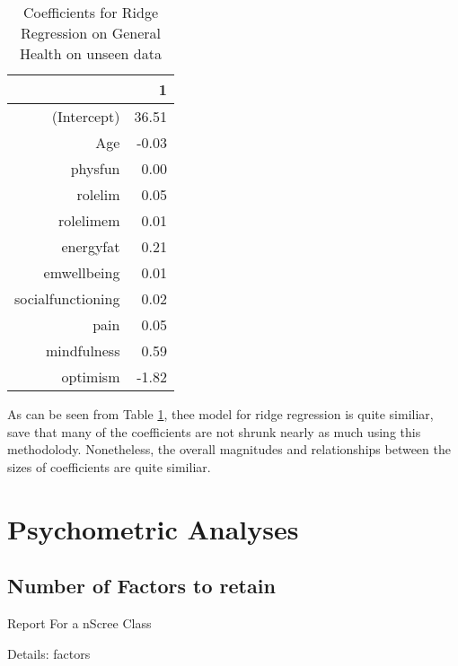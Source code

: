 \documentclass{article}
\begin{document}
\begin{table}[ht]
\centering
\begin{tabular}{rr}
  \hline
 & 1 \\ 
  \hline
(Intercept) & 36.51 \\ 
  Age & -0.03 \\ 
  physfun & 0.00 \\ 
  rolelim & 0.05 \\ 
  rolelimem & 0.01 \\ 
  energyfat & 0.21 \\ 
  emwellbeing & 0.01 \\ 
  socialfunctioning & 0.02 \\ 
  pain & 0.05 \\ 
  mindfulness & 0.59 \\ 
  optimism & -1.82 \\ 
   \hline
\end{tabular}
\caption{Coefficients for Ridge Regression on General Health on unseen data} 
\label{tab:hom1healthridge}
\end{table}
As can be seen from Table \ref{tab:hom1healthridge}, thee model for ridge regression is quite similiar, save that many of the coefficients are not shrunk nearly as much using this methodolody. Nonetheless, the overall magnitudes and relationships between the sizes of coefficients are quite similiar. 



\section{Psychometric Analyses}

\subsection{Number of Factors to retain}


Report For a nScree Class 

Details: factors 
\end{document}
